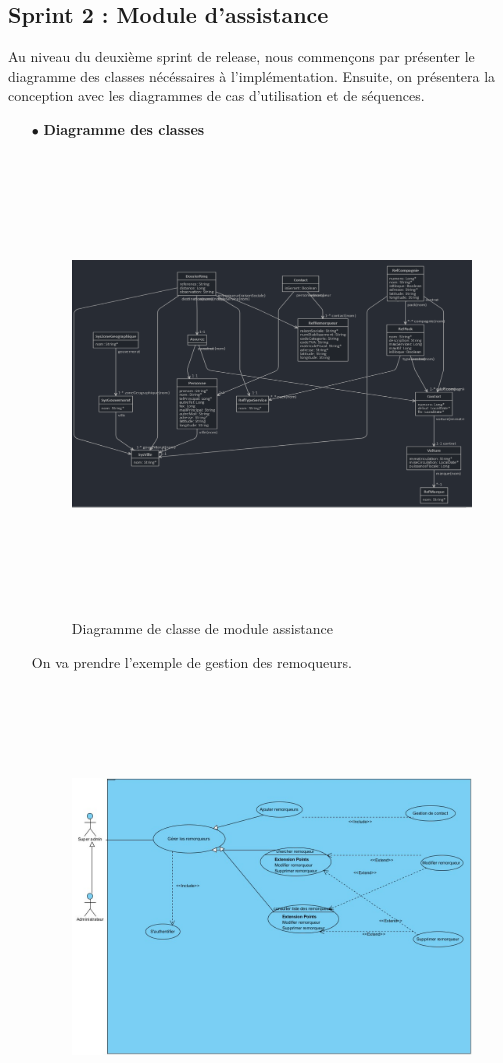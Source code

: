 \documentclass{article}
\begin{document}
\subsection{Sprint 2 : Module d'assistance}
Au niveau du deuxième sprint de release, nous commençons par présenter le diagramme des classes nécéssaires à l'implémentation. Ensuite, on présentera
la conception avec les diagrammes de cas d'utilisation et de  séquences. 
\begin{enumerate}
\item[$\bullet$] \textbf{ Diagramme des classes}
\begin{figure}[H]
\centering
\includegraphics[height=4.8in]{DiagClasseModuleAssistance.PNG}
\caption[Figure13 : Diagramme de classe de module assistance]{Diagramme de classe de module assistance}
\label{fig:pic13}
\end{figure}
On va prendre l'exemple de gestion des remoqueurs.
\begin{figure}[H]
\centering
\includegraphics[height=4.8in]{UseCaseDiagram2.jpg}

\end{figure}
\end{enumerate}
\end{document}
